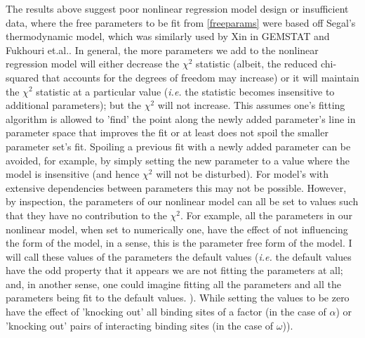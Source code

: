  The results above suggest poor nonlinear regression model design or insufficient data, where the free parameters to be fit from \ref{freeparams} were based off Segal's thermodynamic model, which was similarly used by Xin in GEMSTAT and Fukhouri et.al.\cite{pmid20087339}.  In general, the more parameters we add to the nonlinear regression model will either decrease the $\chi^2$ statistic (albeit, the reduced chi-squared that accounts for the degrees of freedom may increase) or it will maintain the $\chi^2$ statistic at a particular value (\textit{i.e.} the statistic becomes insensitive to additional parameters); but the $\chi^2$ will not increase.  This assumes one's fitting algorithm is allowed to 'find' the point along the newly added parameter's line in parameter space that improves the fit or at least does not spoil the smaller parameter set's fit.  Spoiling a previous fit with a newly added parameter can be avoided, for example, by simply setting the new parameter to a value where the model is insensitive (and hence $\chi^2$ will not be disturbed).  For model's with extensive dependencies between parameters this may not be possible.  However, by inspection, the parameters of our nonlinear model can all be set to values such that they have no contribution to the $\chi^2$.  For example, all the parameters in our nonlinear model, when set to numerically one, have the effect of not influencing the form of the model, in a sense, this is the parameter free form of the model.  I will call these values of the parameters the default values (\textit{i.e.} the default values have the odd property that it appears we are not fitting the parameters at all; and, in another sense, one could imagine fitting all the parameters and all the parameters being fit to the default values. ).  While setting the values to be zero have the effect of 'knocking out' all binding sites of a factor (in the case of $\alpha$) or 'knocking out' pairs of interacting binding sites (in the case of $\omega$)). 
 
